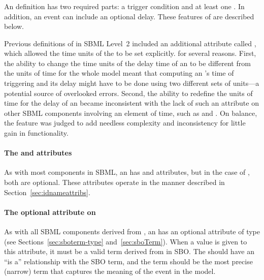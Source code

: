 \subsubsection{}

An \Event definition has two required parts: a
trigger condition and at least one \EventAssignment.  In
  addition, an event can include an optional delay.  These features
  of \Event are described below.

Previous definitions of \Event in SBML Level~2 included an
additional attribute called , which allowed the
time units of the \Delay to be set explicitly.   for several reasons.  First, the ability to
change the time units of the delay time of an \Event to be
different from the units of time for the whole model meant that
computing an \Event's time of triggering and its delay might have
to be done using two different sets of units---a potential source
of overlooked errors.  Second, the ability to redefine the units
of time for the delay of an \Event became inconsistent with the
lack of such an attribute on other SBML \thisLV components involving
an element of time, such as \RateRule and \KineticLaw.  On
balance, the  feature was judged to add needless
complexity and inconsistency for little gain in functionality.


\paragraph{The  and  attributes}
\label{sec:event-id-name}

As with most components in SBML, an \Event has  and
 attributes, but in the case of \Event, both are optional.
These attributes operate in the manner described in
Section~\ref{sec:idnameattribs}.


\paragraph{The optional  attribute on }
\label{sec:event-sboterm}

As with all SBML components derived from \SBase, an
  \Event has an optional attribute  of
  type   (see
  Sections~\ref{sec:sboterm-type} and~\ref{sec:sboTerm}).  When a
value is given to this attribute, it must be a valid
term derived from \sboevent in SBO.  The \Event should have an
``is a'' relationship with the SBO term, and the term should be
the most precise (narrow) term that captures the meaning of the
event in the model.

